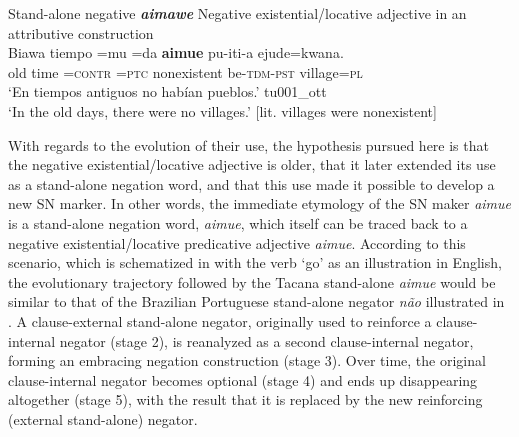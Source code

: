 \documentclass[output=paper]{langsci/langscibook}
\begin{document}
\begin{exe}\ex
\label{ex:tacana-standalone-negative}  Stand-alone negative
\textbf{\textit{aimawe}}
%
\ex\label{ex:tacana-negexadj} Negative existential\slash locative adjective
in an attributive construction\\
\gll {\ob}Biawa tiempo{\cb} =mu =da \textbf{aimue} pu-iti-a ejude=kwana.\\
    old  time  =\textsc{contr}  \textsc{=ptc}  nonexistent
    be-\textsc{tdm-pst}  village=\textsc{pl}\\
\glt `En tiempos antiguos no habían pueblos.' tu001\_ott\\
`In the old days, there were no villages.' [lit. villages were nonexistent]
\end{exe}

With regards to the evolution of their use, the hypothesis pursued
here is that the negative existential\slash locative adjective is older,
that it later extended its use as a stand-alone negation word, and that
this use made it possible to develop a new SN marker. In other words, the
immediate etymology of the SN maker \textit{aimue} is a stand-alone
negation word, \textit{aimue}, which itself can be traced back to a
negative existential\slash locative predicative adjective \textit{aimue}.
According to this scenario, which is schematized in
 with the verb `go' as an illustration in
English, the evolutionary trajectory followed by the Tacana stand-alone
\textit{aimue} would be similar to that of the Brazilian
Portuguese
stand-alone negator \textit{não} illustrated in .
A clause-external stand-alone negator, originally used to reinforce a
clause-internal negator (stage 2), is reanalyzed as a second
clause-internal negator, forming an embracing negation construction (stage
3). Over time, the original clause-internal negator becomes optional (stage
4) and ends up disappearing altogether (stage 5), with the result that it
is replaced by the new reinforcing (external stand-alone)
negator.
\end{document}
